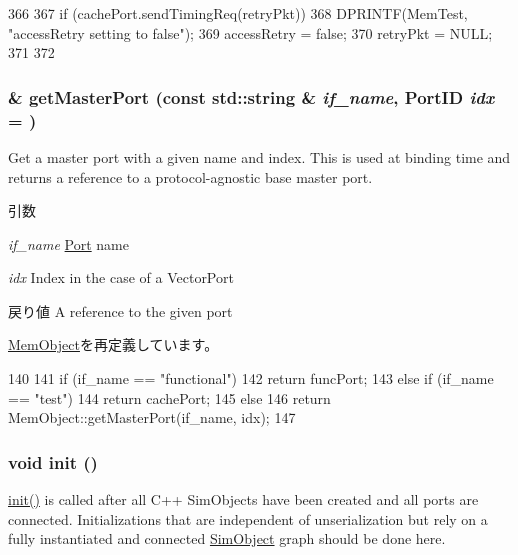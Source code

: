 \begin{DoxyCode}
366 {
367     if (cachePort.sendTimingReq(retryPkt)) {
368         DPRINTF(MemTest, "accessRetry setting to false\n");
369         accessRetry = false;
370         retryPkt = NULL;
371     }
372 }
\end{DoxyCode}
\hypertarget{classMemTest_adc4e675e51defbdd1e354dac729d0703}{
\subsubsection[{getMasterPort}]{ \& getMasterPort (const std::string \& {\em if\_\-name}, \/  {\bf PortID} {\em idx} = {})}}
\label{classMemTest_adc4e675e51defbdd1e354dac729d0703}
Get a master port with a given name and index. This is used at binding time and returns a reference to a protocol-\/agnostic base master port.


\begin{DoxyParams}{引数}
\item[{\em if\_\-name}]\hyperlink{classPort}{Port} name \item[{\em idx}]Index in the case of a VectorPort\end{DoxyParams}
\begin{DoxyReturn}{戻り値}
A reference to the given port 
\end{DoxyReturn}


\hyperlink{classMemObject_adc4e675e51defbdd1e354dac729d0703}{MemObject}を再定義しています。


\begin{DoxyCode}
140 {
141     if (if_name == "functional")
142         return funcPort;
143     else if (if_name == "test")
144         return cachePort;
145     else
146         return MemObject::getMasterPort(if_name, idx);
147 }
\end{DoxyCode}
\hypertarget{classMemTest_a02fd73d861ef2e4aabb38c0c9ff82947}{
\subsubsection[{init}]{\setlength{\rightskip}{0pt plus 5cm}void init ()}}
\label{classMemTest_a02fd73d861ef2e4aabb38c0c9ff82947}
\hyperlink{classMemTest_a02fd73d861ef2e4aabb38c0c9ff82947}{init()} is called after all C++ SimObjects have been created and all ports are connected. Initializations that are independent of unserialization but rely on a fully instantiated and connected \hyperlink{classSimObject}{SimObject} graph should be done here. 

